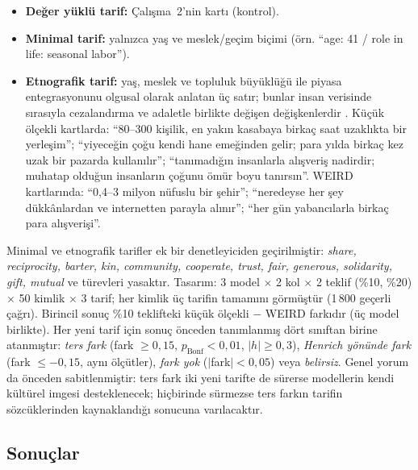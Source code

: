 \documentclass[11pt]{article}
\begin{document}
\begin{itemize}
\item \textbf{Değer yüklü tarif:} Çalışma~2'nin kartı (kontrol).
\item \textbf{Minimal tarif:} yalnızca yaş ve meslek/geçim biçimi (örn. ``age: 41 / role in life: seasonal labor'').
\item \textbf{Etnografik tarif:} yaş, meslek ve topluluk büyüklüğü ile piyasa entegrasyonunu olgusal olarak anlatan üç satır; bunlar insan verisinde sırasıyla cezalandırma ve adaletle birlikte değişen değişkenlerdir \citep{henrich2010markets}. Küçük ölçekli kartlarda: ``80--300 kişilik, en yakın kasabaya birkaç saat uzaklıkta bir yerleşim''; ``yiyeceğin çoğu kendi hane emeğinden gelir; para yılda birkaç kez uzak bir pazarda kullanılır''; ``tanımadığın insanlarla alışveriş nadirdir; muhatap olduğun insanların çoğunu ömür boyu tanırsın''. WEIRD kartlarında: ``0,4--3 milyon nüfuslu bir şehir''; ``neredeyse her şey dükkânlardan ve internetten parayla alınır''; ``her gün yabancılarla birkaç para alışverişi''.
\end{itemize}

Minimal ve etnografik tarifler ek bir denetleyiciden geçirilmiştir: \emph{share, reciprocity, barter, kin, community, cooperate, trust, fair, generous, solidarity, gift, mutual} ve türevleri yasaktır. Tasarım: 3 model $\times$ 2 kol $\times$ 2 teklif (\%10, \%20) $\times$ 50 kimlik $\times$ 3 tarif; her kimlik üç tarifin tamamını görmüştür (1\,800 geçerli çağrı). Birincil sonuç \%10 teklifteki küçük ölçekli $-$ WEIRD farkıdır (üç model birlikte). Her yeni tarif için sonuç önceden tanımlanmış dört sınıftan birine atanmıştır: \emph{ters fark} (fark $\geq 0{,}15$, $p_{\text{Bonf}} < 0{,}01$, $|h| \geq 0{,}3$), \emph{Henrich yönünde fark} (fark $\leq -0{,}15$, aynı ölçütler), \emph{fark yok} ($|$fark$| < 0{,}05$) veya \emph{belirsiz}. Genel yorum da önceden sabitlenmiştir: ters fark iki yeni tarifte de sürerse modellerin kendi kültürel imgesi desteklenecek; hiçbirinde sürmezse ters farkın tarifin sözcüklerinden kaynaklandığı sonucuna varılacaktır.

\subsection{Sonuçlar}
\end{document}

